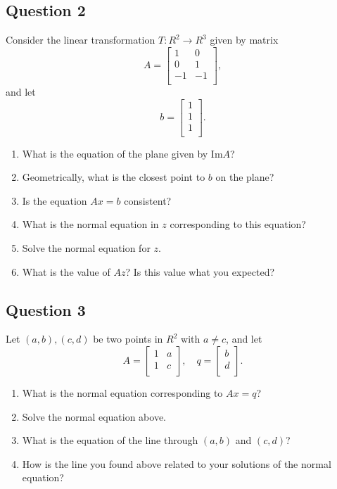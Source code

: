\documentclass[12pt, a4paper]{article}
\begin{document}
\subsection*{Question 2}
  Consider the linear transformation  $T : R^2 \rightarrow R^3$ given by matrix
\[
A = \begin{bmatrix}
  1  & 0 \\
  0  & 1 \\
  -1 & -1 \\
\end{bmatrix},
\]
and let
\[
b = \begin{bmatrix}
  1 \\
  1 \\
  1 \\
  \end{bmatrix}.
\]
\begin{enumerate}
\item What is the equation of the plane given by Im$A$?
\item Geometrically, what is the closest point to $b$ on the plane? 
\item Is the equation $Ax = b$ consistent?
\item What is the normal equation in $z$ corresponding to this equation?
\item Solve the normal equation for $z$.
\item What is the value of $Az$? Is this value what you expected?
\end{enumerate}

\subsection*{Question 3}
Let $(a,b), (c,d)$ be two points in $R^2$ with $a \ne c$, and let
\[
A = \begin{bmatrix}
  1 & a \\
  1 & c \\
\end{bmatrix},
\quad
q = 
\begin{bmatrix}
  b \\
  d \\
\end{bmatrix}.
\]
\begin{enumerate}
\item What is the normal equation corresponding to $Ax = q$?
\item Solve the normal equation above.
\item What is the equation of the line through $(a,b)$ and $(c,d)$?
  \item How is the line you found above related to your solutions of the normal equation?
  \end{enumerate}
\end{document}
